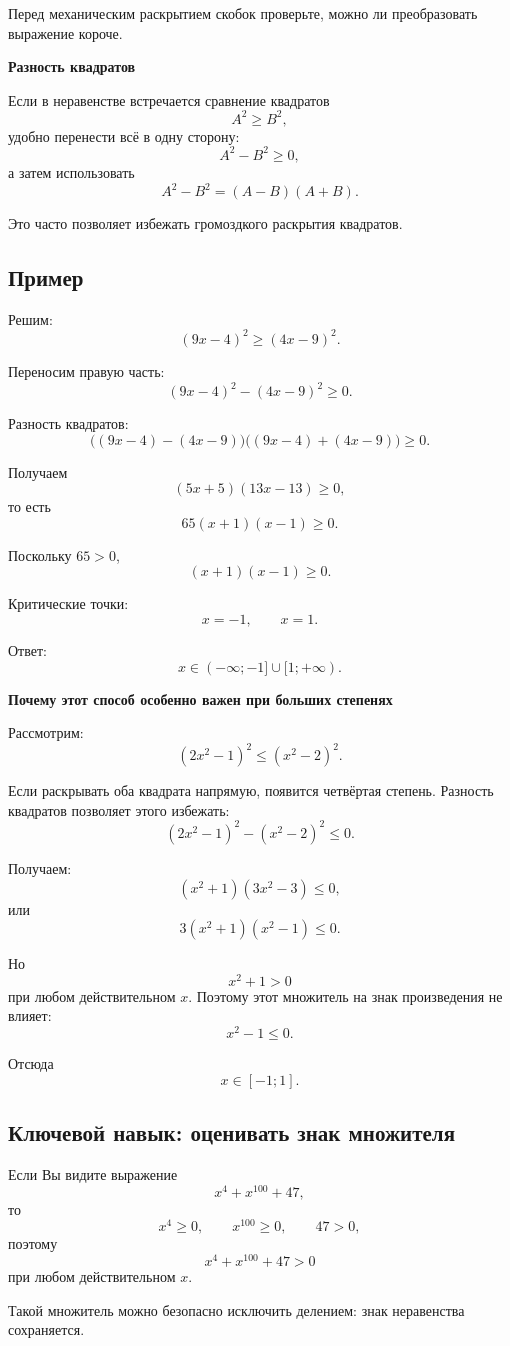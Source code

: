 \documentclass[a4paper,12pt]{article}
\newcommand{\keyidea}[1]{%
    \medskip
    {\color{darkaccent}\bfseries #1}
    \smallskip
}
\begin{document}
Перед механическим раскрытием скобок проверьте, можно ли преобразовать
выражение короче.

\keyidea{Разность квадратов}

Если в неравенстве встречается сравнение квадратов
\[
A^2\ge B^2,
\]
удобно перенести всё в одну сторону:
\[
A^2-B^2\ge0,
\]
а затем использовать
\[
A^2-B^2=(A-B)(A+B).
\]

Это часто позволяет избежать громоздкого раскрытия квадратов.

\subsection*{Пример}

Решим:
\[
(9x-4)^2\ge(4x-9)^2.
\]

Переносим правую часть:
\[
(9x-4)^2-(4x-9)^2\ge0.
\]

Разность квадратов:
\[
\bigl((9x-4)-(4x-9)\bigr)
\bigl((9x-4)+(4x-9)\bigr)\ge0.
\]

Получаем
\[
(5x+5)(13x-13)\ge0,
\]
то есть
\[
65(x+1)(x-1)\ge0.
\]

Поскольку \(65>0\),
\[
(x+1)(x-1)\ge0.
\]

Критические точки:
\[
x=-1,\qquad x=1.
\]

Ответ:
\[
\boxed{x\in(-\infty;-1]\cup[1;+\infty)}.
\]

\keyidea{Почему этот способ особенно важен при больших степенях}

Рассмотрим:
\[
(2x^2-1)^2\le(x^2-2)^2.
\]

Если раскрывать оба квадрата напрямую, появится четвёртая степень.
Разность квадратов позволяет этого избежать:
\[
(2x^2-1)^2-(x^2-2)^2\le0.
\]

Получаем:
\[
(x^2+1)(3x^2-3)\le0,
\]
или
\[
3(x^2+1)(x^2-1)\le0.
\]

Но
\[
x^2+1>0
\]
при любом действительном \(x\). Поэтому этот множитель на знак
произведения не влияет:
\[
x^2-1\le0.
\]

Отсюда
\[
\boxed{x\in[-1;1]}.
\]

\subsection*{Ключевой навык: оценивать знак множителя}

Если Вы видите выражение
\[
x^4+x^{100}+47,
\]
то
\[
x^4\ge0,\qquad
x^{100}\ge0,\qquad
47>0,
\]
поэтому
\[
\boxed{x^4+x^{100}+47>0}
\]
при любом действительном \(x\).

Такой множитель можно безопасно исключить делением:
знак неравенства сохраняется.
\end{document}
